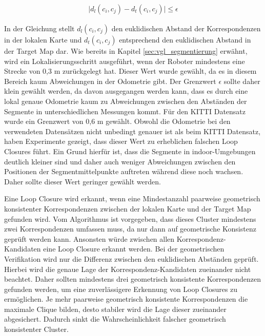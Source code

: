 \begin{align}
	\vert d_l(c_i,c_j)-d_t(c_i,c_j) \vert \leq \epsilon
\end{align}

In der Gleichung stellt $d_l(c_i,c_j)$ den euklidischen Abstand der Korrespondenzen in der lokalen Karte und $d_t(c_i,c_j)$ entsprechend den euklidischen Abstand in der Target Map dar. Wie bereits in Kapitel \ref{sec:vgl_segmentierung} erwähnt, wird ein Lokalisierungsschritt ausgeführt, wenn der Roboter mindestens eine Strecke von 0,3 m zurückgelegt hat. Dieser Wert wurde gewählt, da es in diesem Bereich kaum Abweichungen in der Odometrie gibt. Der Grenzwert $\epsilon$ sollte daher klein gewählt werden, da davon ausgegangen werden kann, dass es durch eine lokal genaue Odometrie kaum zu Abweichungen zwischen den Abständen der Segmente in unterschiedlichen Messungen kommt. Für den KITTI Datensatz wurde ein Grenzwert von 0,6 m gewählt. Obwohl die Odometrie bei den verwendeten Datensätzen nicht unbedingt genauer ist als beim KITTI Datensatz, haben Experimente gezeigt, dass dieser Wert zu erheblichen falschen Loop Closures führt. Ein Grund hierfür ist, dass die Segmente in indoor-Umgebungen deutlich kleiner sind und daher auch weniger Abweichungen zwischen den Positionen der Segmentmittelpunkte auftreten während diese noch wachsen. Daher sollte dieser Wert geringer gewählt werden.


Eine Loop Closure wird erkannt, wenn eine Mindestanzahl paarweise geometrisch konsistenter Korrespondenzen zwischen der lokalen Karte und der Target Map gefunden wird. Vom Algorithmus ist vorgegeben, dass dieses  Cluster mindestens zwei Korrespondenzen umfassen muss, da nur dann auf geometrische Konsistenz geprüft werden kann. Ansonsten würde zwischen allen Korrespondenz-Kandidaten eine Loop Closure erkannt werden. Bei der geometrischen Verifikation wird nur die Differenz zwischen den eu\-kli\-disch\-en Abständen geprüft. Hierbei wird die genaue Lage der Korrespondenz-Kandidaten zueinander nicht beachtet. Daher sollten mindestens drei geometrisch konsistente Korrespondenzen gefunden werden, um eine zuverlässigere Erkennung von Loop Closures zu ermöglichen. Je mehr paarweise geometrisch konsistente Korrespondenzen die maximale Clique bilden, desto stabiler wird die Lage dieser zueinander abgesichert. Dadurch sinkt die Wahrscheinlichkeit falscher geometrisch konsistenter Cluster. 

